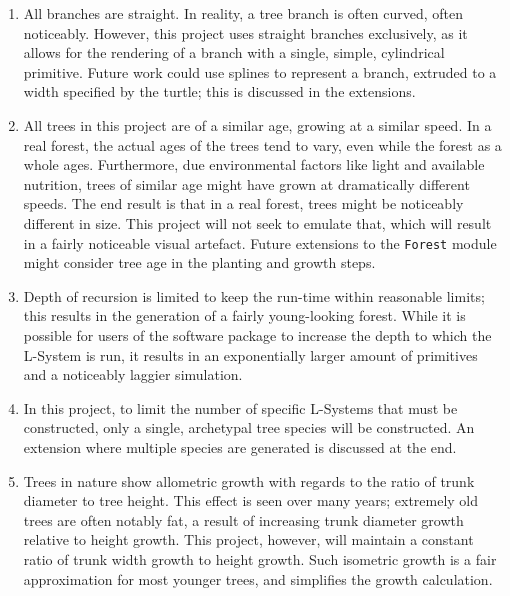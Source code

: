 \documentclass{article}
\begin{document}
\begin{enumerate}
    \item All branches are straight. In reality, a tree branch is often curved, often
noticeably. However, this project uses straight branches exclusively, as it allows for the
rendering of a branch with a single, simple, cylindrical primitive. Future work could use splines
to represent a branch, extruded to a width specified by the turtle; this is discussed in the
extensions.

    \item All trees in this project are of a similar age, growing at a similar speed. In a real
forest, the actual ages of the trees tend to vary, even while the forest as a whole ages.
Furthermore, due environmental factors like light and available nutrition, trees of similar age might
have grown at dramatically different speeds. The end result is that in a real forest, trees might be
noticeably different in size. This project will not seek to emulate that, which will result in
a fairly noticeable visual artefact. Future extensions to the \verb|Forest| module might consider
tree age in the planting and growth steps.

    \item Depth of recursion is limited to keep the run-time within reasonable limits; this results
in the generation of a fairly young-looking forest. While it is
possible for users of the software package to increase the depth to which the
L-System is run, it results in an exponentially larger amount of primitives and a noticeably
laggier simulation.

    \item In this project, to limit the number of specific L-Systems that must be constructed, only
a single, archetypal tree species will be constructed. An extension where multiple species are
generated is discussed at the end.

    \item Trees in nature show allometric growth with regards to the ratio of trunk diameter to
tree height\cite{bugmann01}. This effect is seen over many years; extremely old trees are often
notably fat, a result of increasing trunk diameter growth relative to height growth. This project,
however, will maintain a constant ratio of trunk width growth to height growth. Such isometric
growth is a fair approximation for most younger trees, and simplifies the growth calculation.

\end{enumerate}
\end{document}
